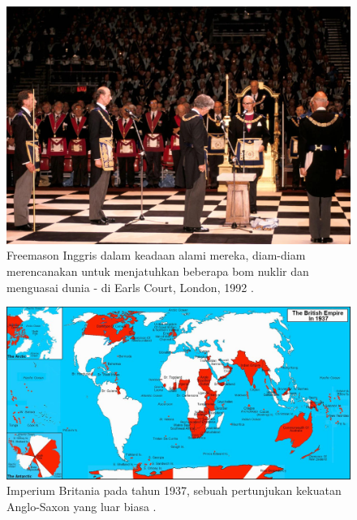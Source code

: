 \documentclass[10pt,twocolumn,letterpaper]{article}
\begin{document}
\begin{figure}[b]
\begin{center}

\includegraphics[width=1\linewidth]{freemason.jpg}
\end{center}
   \caption{Freemason Inggris dalam keadaan alami mereka, diam-diam merencanakan untuk menjatuhkan beberapa bom nuklir dan menguasai dunia - di Earls Court, London, 1992 \cite{5}.}
\label{fig:1}
\label{fig:onecol}
\end{figure}

\begin{figure}[t]
\begin{center}
\includegraphics[width=1\textwidth]{british.jpg}
\end{center}
   \caption{Imperium Britania pada tahun 1937, sebuah pertunjukan kekuatan Anglo-Saxon yang luar biasa \cite{14}.}
   \label{fig:2}
\end{figure}
\end{document}
